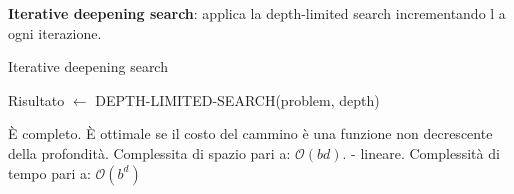 \textbf{Iterative deepening search}: applica la depth-limited search incrementando
l a ogni iterazione.

\begin{algorithm}
    \caption{Iterative deepening search}
    \label{alg:search2}
    \begin{algorithmic}[1] %
         
            \State Risultato $\leftarrow$ DEPTH-LIMITED-SEARCH(problem, depth)
              \EndIf
			\EndFor
        \EndProcedure
    \end{algorithmic}
\end{algorithm}

È completo.
È ottimale se il costo del cammino è una funzione non decrescente della profondità.
Complessita di spazio pari a: $\mathcal{O}(bd).$ - lineare.
Complessità di tempo pari a: $\mathcal{O}(b^d)$\\
